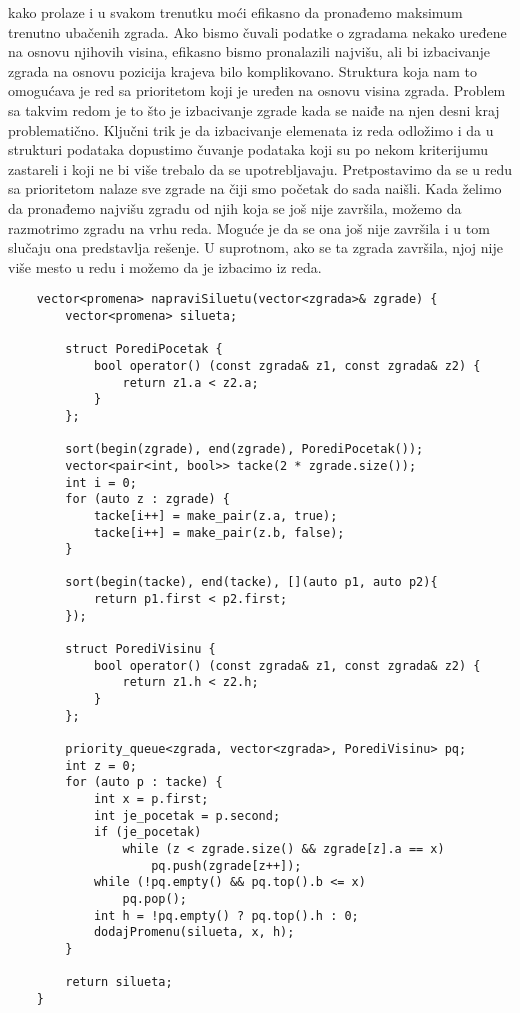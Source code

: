 \documentclass{article}
\begin{document}
kako prolaze i u svakom trenutku moći
efikasno da pronađemo maksimum trenutno ubačenih zgrada. Ako bismo čuvali podatke o zgradama nekako uređene na osnovu njihovih visina, efikasno
bismo pronalazili najvišu, ali bi izbacivanje zgrada na osnovu pozicija krajeva bilo
komplikovano. Struktura koja nam to omogućava je red sa prioritetom koji je uređen na osnovu
visina zgrada. Problem sa takvim redom je to što je izbacivanje zgrade kada
se naiđe na njen desni kraj problematično. Ključni trik je da
izbacivanje elemenata iz reda odložimo i da u strukturi podataka dopustimo
čuvanje podataka koji su po nekom kriterijumu zastareli i koji ne bi više trebalo
da se upotrebljavaju. Pretpostavimo da se u redu sa prioritetom nalaze sve zgrade na čiji smo početak do sada naišli. Kada želimo da pronađemo najvišu
zgradu od njih koja se još nije završila, možemo da razmotrimo zgradu na vrhu
reda. Moguće je da se ona još nije završila i u tom slučaju ona predstavlja rešenje.
U suprotnom, ako se ta zgrada završila, njoj nije više mesto u redu i možemo
da je izbacimo iz reda.
\begin{lstlisting}
    vector<promena> napraviSiluetu(vector<zgrada>& zgrade) {
        vector<promena> silueta;
        
        struct PorediPocetak {
            bool operator() (const zgrada& z1, const zgrada& z2) {
                return z1.a < z2.a;
            }
        };
        
        sort(begin(zgrade), end(zgrade), PorediPocetak());
        vector<pair<int, bool>> tacke(2 * zgrade.size());
        int i = 0;
        for (auto z : zgrade) {
            tacke[i++] = make_pair(z.a, true);
            tacke[i++] = make_pair(z.b, false);
        }
        
        sort(begin(tacke), end(tacke), [](auto p1, auto p2){
            return p1.first < p2.first;
        });
        
        struct PorediVisinu {
            bool operator() (const zgrada& z1, const zgrada& z2) {
                return z1.h < z2.h;
            }
        };
        
        priority_queue<zgrada, vector<zgrada>, PorediVisinu> pq;
        int z = 0;
        for (auto p : tacke) {
            int x = p.first;
            int je_pocetak = p.second;
            if (je_pocetak)
                while (z < zgrade.size() && zgrade[z].a == x)
                    pq.push(zgrade[z++]);
            while (!pq.empty() && pq.top().b <= x)
                pq.pop();
            int h = !pq.empty() ? pq.top().h : 0;
            dodajPromenu(silueta, x, h);
        }
        
        return silueta;
    }
\end{lstlisting}
\end{document}
